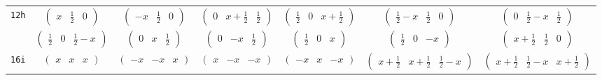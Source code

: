 \documentclass[fleqn,9pt,landscape]{jsarticle}
\begin{document}
\begin{center}
\begin{longtable}{ccccccc}
{\tt 12h} & $ \begin{pmatrix} x & \frac{1}{2} & 0 \end{pmatrix} $ & $ \begin{pmatrix} - x & \frac{1}{2} & 0 \end{pmatrix} $ & $ \begin{pmatrix} 0 & x + \frac{1}{2} & \frac{1}{2} \end{pmatrix} $ & $ \begin{pmatrix} \frac{1}{2} & 0 & x + \frac{1}{2} \end{pmatrix} $ & $ \begin{pmatrix} \frac{1}{2} - x & \frac{1}{2} & 0 \end{pmatrix} $ & $ \begin{pmatrix} 0 & \frac{1}{2} - x & \frac{1}{2} \end{pmatrix} $ \\
& $ \begin{pmatrix} \frac{1}{2} & 0 & \frac{1}{2} - x \end{pmatrix} $ & $ \begin{pmatrix} 0 & x & \frac{1}{2} \end{pmatrix} $ & $ \begin{pmatrix} 0 & - x & \frac{1}{2} \end{pmatrix} $ & $ \begin{pmatrix} \frac{1}{2} & 0 & x \end{pmatrix} $ & $ \begin{pmatrix} \frac{1}{2} & 0 & - x \end{pmatrix} $ & $ \begin{pmatrix} x + \frac{1}{2} & \frac{1}{2} & 0 \end{pmatrix} $ \\ \hline
{\tt 16i} & $ \begin{pmatrix} x & x & x \end{pmatrix} $ & $ \begin{pmatrix} - x & - x & x \end{pmatrix} $ & $ \begin{pmatrix} x & - x & - x \end{pmatrix} $ & $ \begin{pmatrix} - x & x & - x \end{pmatrix} $ & $ \begin{pmatrix} x + \frac{1}{2} & x + \frac{1}{2} & \frac{1}{2} - x \end{pmatrix} $ & $ \begin{pmatrix} x + \frac{1}{2} & \frac{1}{2} - x & x + \frac{1}{2} \end{pmatrix} $ \\

\end{longtable}
\end{center}
\end{document}
